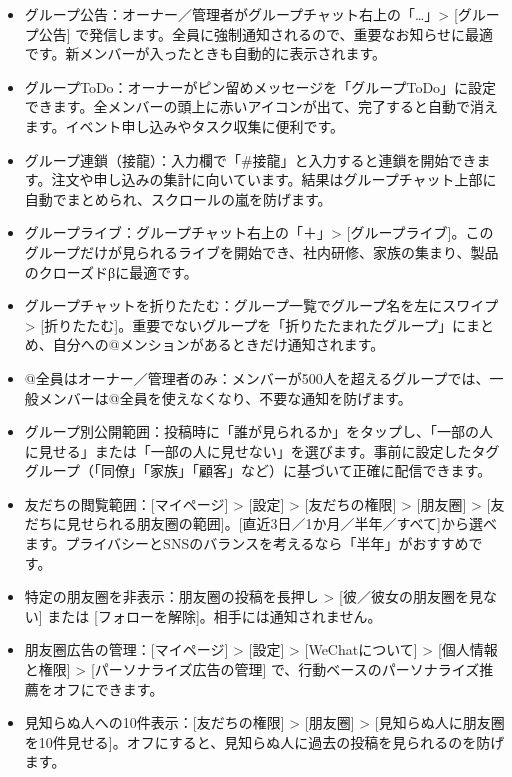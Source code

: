 \begin{itemize}
  \item グループ公告：オーナー／管理者がグループチャット右上の「…」> [グループ公告] で発信します。全員に強制通知されるので、重要なお知らせに最適です。新メンバーが入ったときも自動的に表示されます。
  \item グループToDo：オーナーがピン留めメッセージを「グループToDo」に設定できます。全メンバーの頭上に赤いアイコンが出て、完了すると自動で消えます。イベント申し込みやタスク収集に便利です。
  \item グループ連鎖（接龍）：入力欄で「\#接龍」と入力すると連鎖を開始できます。注文や申し込みの集計に向いています。結果はグループチャット上部に自動でまとめられ、スクロールの嵐を防げます。
  \item グループライブ：グループチャット右上の「＋」> [グループライブ]。このグループだけが見られるライブを開始でき、社内研修、家族の集まり、製品のクローズドβに最適です。
  \item グループチャットを折りたたむ：グループ一覧でグループ名を左にスワイプ > [折りたたむ]。重要でないグループを「折りたたまれたグループ」にまとめ、自分への@メンションがあるときだけ通知されます。
  \item @全員はオーナー／管理者のみ：メンバーが500人を超えるグループでは、一般メンバーは@全員を使えなくなり、不要な通知を防げます。
\end{itemize}


\begin{itemize}
  \item グループ別公開範囲：投稿時に「誰が見られるか」をタップし、「一部の人に見せる」または「一部の人に見せない」を選びます。事前に設定したタググループ（「同僚」「家族」「顧客」など）に基づいて正確に配信できます。
  \item 友だちの閲覧範囲：[マイページ] > [設定] > [友だちの権限] > [朋友圈] > [友だちに見せられる朋友圈の範囲]。[直近3日／1か月／半年／すべて]から選べます。プライバシーとSNSのバランスを考えるなら「半年」がおすすめです。
  \item 特定の朋友圈を非表示：朋友圈の投稿を長押し > [彼／彼女の朋友圈を見ない] または [フォローを解除]。相手には通知されません。
  \item 朋友圈広告の管理：[マイページ] > [設定] > [WeChatについて] > [個人情報と権限] > [パーソナライズ広告の管理] で、行動ベースのパーソナライズ推薦をオフにできます。
  \item 見知らぬ人への10件表示：[友だちの権限] > [朋友圈] > [見知らぬ人に朋友圈を10件見せる]。オフにすると、見知らぬ人に過去の投稿を見られるのを防げます。
\end{itemize}

